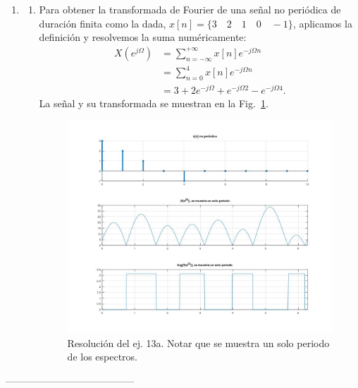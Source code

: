 \documentclass[10pt,a4paper]{article}
\begin{document}
\begin{enumerate}
\item
\begin{enumerate}
\item Para obtener la transformada de Fourier de una señal no periódica de duración finita como la dada, 
$x[n]=\{3\quad 2\quad 1\quad 0 \quad -1\}$, aplicamos la definición y resolvemos la suma numéricamente:
\begin{align}
X(e^{j\Omega}) &= \sum_{n=-\infty}^{+\infty}x[n]e^{-j\Omega n}\\
&= \sum_{n=0}^{4}x[n]e^{-j\Omega n}\\
&= \boxed{3+2e^{-j\Omega}+e^{-j\Omega 2}-e^{-j\Omega 4}}.
\end{align}
La señal y su transformada se muestran en la Fig.~\ref{fig:ej_13a}.
\begin{figure}[h]
	\begin{center}
		\includegraphics[width=16cm]{tp8_ej13a.jpg}
	\end{center}
	\caption{Resolución del ej. 13a. Notar que se muestra un solo periodo de los espectros.}
	\label{fig:ej_13a}
\end{figure}

\end{enumerate}


\end{enumerate}
\begin{center}
---------------------------------------
\end{center}
\end{document}
